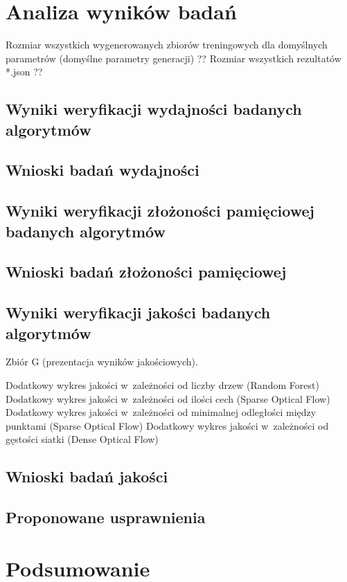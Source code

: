 \chapter{Analiza wyników badań}\label{Chapter_AnalizaRezultatow}

  Rozmiar wszystkich wygenerowanych zbiorów treningowych dla domyślnych parametrów (domyślne parametry generacji) ??
  Rozmiar wszystkich rezultatów *.json ??

  \section{Wyniki weryfikacji wydajności badanych algorytmów}\label{Section_Performance}

  \section{Wnioski badań wydajności}\label{Section_PerformanceWnioski}

  \section{Wyniki weryfikacji złożoności pamięciowej badanych algorytmów}\label{Section_MemoryPerformance}

  \section{Wnioski badań złożoności pamięciowej}\label{Section_MemoryPerformanceWnioski}

  \section{Wyniki weryfikacji jakości badanych algorytmów}\label{Section_Quality}

  Zbiór G (prezentacja wyników jakościowych).

  Dodatkowy wykres jakości w~zależności od liczby drzew (Random Forest)
  Dodatkowy wykres jakości w~zależności od ilości cech (Sparse Optical Flow)
  Dodatkowy wykres jakości w~zależności od minimalnej odległości między punktami (Sparse Optical Flow)
  Dodatkowy wykres jakości w~zależności od gęstości siatki (Dense Optical Flow)

  \section{Wnioski badań jakości}\label{Section_QualityWnioski}

  \section{Proponowane usprawnienia}\label{Section_Usprawnienia}

\chapter{Podsumowanie}\label{Section_Podsumowanie}